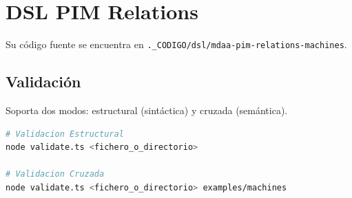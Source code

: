 \section{DSL PIM Relations}

Su código fuente se encuentra en \texttt{.\_CODIGO/dsl/mdaa-pim-relations-machines}.

\subsection{Validación}
Soporta dos modos: estructural (sintáctica) y cruzada (semántica).

\begin{lstlisting}[language=bash]
# Validacion Estructural
node validate.ts <fichero_o_directorio>

# Validacion Cruzada
node validate.ts <fichero_o_directorio> examples/machines
\end{lstlisting}
